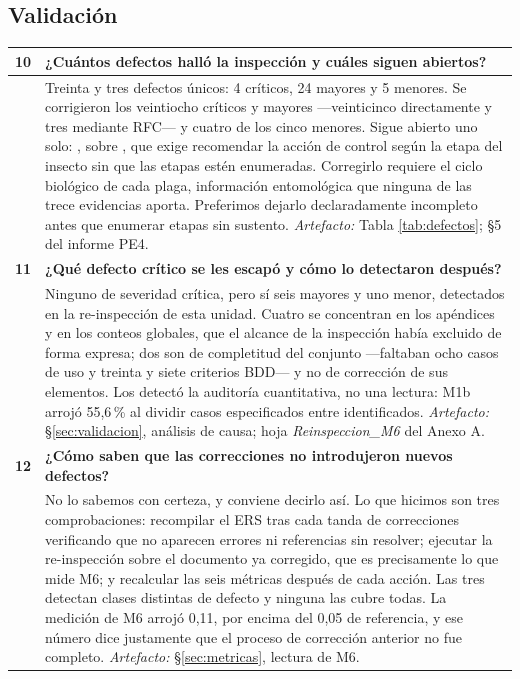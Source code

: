 \subsection*{Validación}

\begin{longtable}{|C{0.7cm}|L{14.6cm}|}
\hline
{}\textbf{10} & \textbf{¿Cuántos defectos halló la inspección y cuáles siguen abiertos?}\\ \hline
& Treinta y tres defectos únicos: 4 críticos, 24 mayores y 5 menores. Se corrigieron los veintiocho críticos y mayores ---veinticinco directamente y tres mediante RFC--- y cuatro de los cinco menores. Sigue abierto uno solo: , sobre , que exige recomendar la acción de control según la etapa del insecto sin que las etapas estén enumeradas. Corregirlo requiere el ciclo biológico de cada plaga, información entomológica que ninguna de las trece evidencias aporta. Preferimos dejarlo declaradamente incompleto antes que enumerar etapas sin sustento. \newline \emph{Artefacto:} Tabla \ref{tab:defectos}; \S5 del informe PE4.\\ \hline
{}\textbf{11} & \textbf{¿Qué defecto crítico se les escapó y cómo lo detectaron después?}\\ \hline
& Ninguno de severidad crítica, pero sí seis mayores y uno menor, detectados en la re-inspección de esta unidad. Cuatro se concentran en los apéndices y en los conteos globales, que el alcance de la inspección había excluido de forma expresa; dos son de completitud del conjunto ---faltaban ocho casos de uso y treinta y siete criterios BDD--- y no de corrección de sus elementos. Los detectó la auditoría cuantitativa, no una lectura: M1b arrojó 55,6\,\% al dividir casos especificados entre identificados. \newline \emph{Artefacto:} \S\ref{sec:validacion}, análisis de causa; hoja \emph{Reinspeccion\_M6} del Anexo A.\\ \hline
{}\textbf{12} & \textbf{¿Cómo saben que las correcciones no introdujeron nuevos defectos?}\\ \hline
& No lo sabemos con certeza, y conviene decirlo así. Lo que hicimos son tres comprobaciones: recompilar el ERS tras cada tanda de correcciones verificando que no aparecen errores ni referencias sin resolver; ejecutar la re-inspección sobre el documento ya corregido, que es precisamente lo que mide M6; y recalcular las seis métricas después de cada acción. Las tres detectan clases distintas de defecto y ninguna las cubre todas. La medición de M6 arrojó 0,11, por encima del 0,05 de referencia, y ese número dice justamente que el proceso de corrección anterior no fue completo. \newline \emph{Artefacto:} \S\ref{sec:metricas}, lectura de M6.\\ \hline
\end{longtable}

